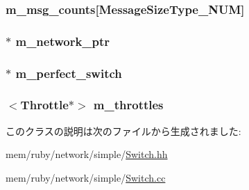 \hypertarget{classSwitch_aab66b83ab5d0c228e10abb19ddbc78f2}{
\subsubsection[{m\_\-msg\_\-counts}]{ {\bf m\_\-msg\_\-counts}\mbox{[}MessageSizeType\_\-NUM\mbox{]}}}
\label{classSwitch_aab66b83ab5d0c228e10abb19ddbc78f2}
\hypertarget{classSwitch_a512555c08578dfab6c301b43cc2b0f1b}{
\subsubsection[{m\_\-network\_\-ptr}]{$\ast$ {\bf m\_\-network\_\-ptr}}}
\label{classSwitch_a512555c08578dfab6c301b43cc2b0f1b}
\hypertarget{classSwitch_a1e62591a6bf9b516ffb6d140c3c75e14}{
\subsubsection[{m\_\-perfect\_\-switch}]{$\ast$ {\bf m\_\-perfect\_\-switch}}}
\label{classSwitch_a1e62591a6bf9b516ffb6d140c3c75e14}
\hypertarget{classSwitch_a764f898917b49de64070c3ff93124b66}{
\subsubsection[{m\_\-throttles}]{$<${\bf Throttle}$\ast$$>$ {\bf m\_\-throttles}}}
\label{classSwitch_a764f898917b49de64070c3ff93124b66}


このクラスの説明は次のファイルから生成されました:\begin{DoxyCompactItemize}
\item 
mem/ruby/network/simple/\hyperlink{Switch_8hh}{Switch.hh}\item 
mem/ruby/network/simple/\hyperlink{Switch_8cc}{Switch.cc}\end{DoxyCompactItemize}
